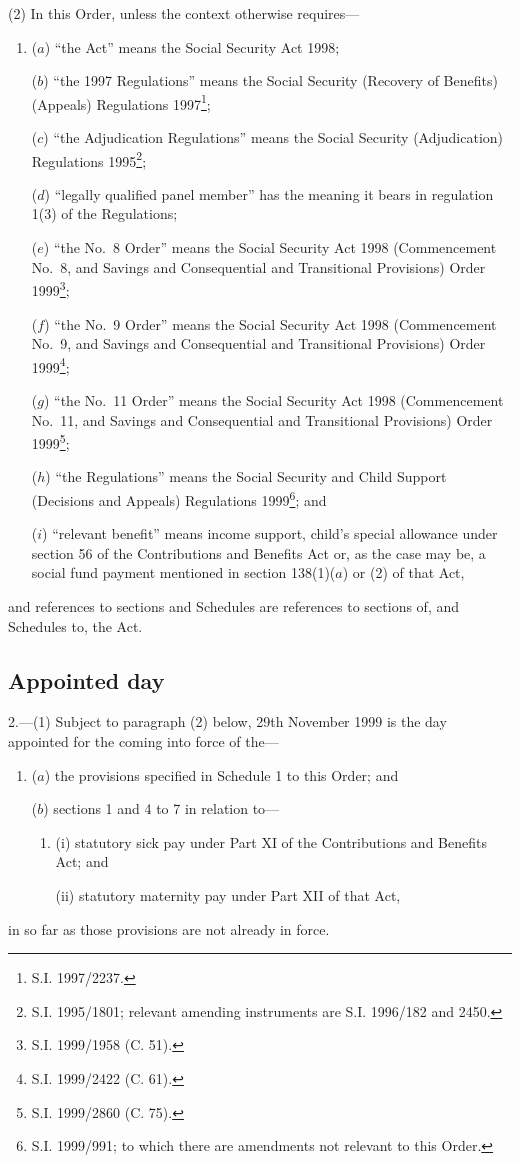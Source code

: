 \documentclass[12pt,a4paper]{article}
\begin{document}
(2) In this Order, unless the context otherwise requires---
\begin{enumerate}\item[]
($a$) “the Act” means the Social Security Act 1998;

($b$) “the 1997 Regulations” means the Social Security (Recovery of Benefits) (Appeals) Regulations 1997\footnote{\frenchspacing S.I. 1997/2237.};

($c$) “the Adjudication Regulations” means the Social Security (Adjudication) Regulations 1995\footnote{\frenchspacing S.I. 1995/1801; relevant amending instruments are S.I. 1996/182 and 2450.};

($d$) “legally qualified panel member” has the meaning it bears in regulation 1(3) of the Regulations;

($e$) “the No.\ 8 Order” means the Social Security Act 1998 (Commencement No.\ 8, and Savings and Consequential and Transitional Provisions) Order 1999\footnote{\frenchspacing S.I. 1999/1958 (C. 51).};

($f$) “the No.\ 9 Order” means the Social Security Act 1998 (Commencement No.\ 9, and Savings and Consequential and Transitional Provisions) Order 1999\footnote{\frenchspacing S.I. 1999/2422 (C. 61).};

($g$) “the No.\ 11 Order” means the Social Security Act 1998 (Commencement No.\ 11, and Savings and Consequential and Transitional Provisions) Order 1999\footnote{\frenchspacing S.I. 1999/2860 (C. 75).};

($h$) “the Regulations” means the Social Security and Child Support (Decisions and Appeals) Regulations 1999\footnote{\frenchspacing S.I. 1999/991; to which there are amendments not relevant to this Order.}; and

($i$) “relevant benefit” means income support, child’s special allowance under section 56 of the Contributions and Benefits Act or, as the case may be, a social fund payment mentioned in section 138(1)($a$)  or (2) of that Act,
\end{enumerate}
and references to sections and Schedules are references to sections of, and Schedules to, the Act.

\subsection[2. Appointed day]{Appointed day}

2.---(1)  Subject to paragraph (2) below, 29th November 1999 is the day appointed for the coming into force of the---
\begin{enumerate}\item[]
($a$) the provisions specified in Schedule 1 to this Order; and

($b$) sections 1 and 4 to 7 in relation to---
\begin{enumerate}\item[]
(i) statutory sick pay under Part XI of the Contributions and Benefits Act; and

(ii) statutory maternity pay under Part XII of that Act,
\end{enumerate}
\end{enumerate}
in so far as those provisions are not already in force.
\end{document}
